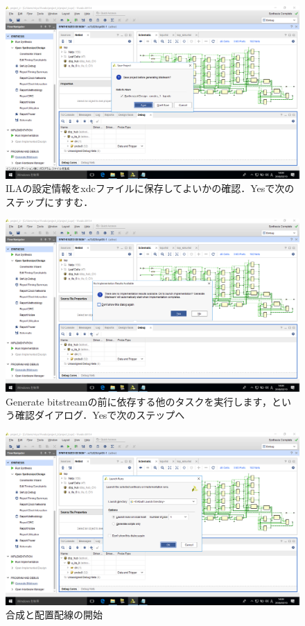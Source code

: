 \documentclass[a4paper,dvipdfmx]{jsarticle}
\begin{document}
 \begin{figure}[H]
  \begin{center}
   \includegraphics[width=.8\textwidth]{chapter05_figures/VirtualBox_Windows10_19_03_2018_14_04_33.png}
  \end{center}
  \caption{ILAの設定情報をxdcファイルに保存してよいかの確認．Yesで次のステップにすすむ．}
 \end{figure}

 \begin{figure}[H]
  \begin{center}
   \includegraphics[width=.8\textwidth]{chapter05_figures/VirtualBox_Windows10_19_03_2018_14_04_44.png}
  \end{center}
  \caption{Generate bitstreamの前に依存する他のタスクを実行します，という確認ダイアログ．Yesで次のステップへ}
 \end{figure}

 \begin{figure}[H]
  \begin{center}
   \includegraphics[width=.8\textwidth]{chapter05_figures/VirtualBox_Windows10_19_03_2018_14_04_49.png}
  \end{center}
  \caption{合成と配置配線の開始}
 \end{figure}
\end{document}
